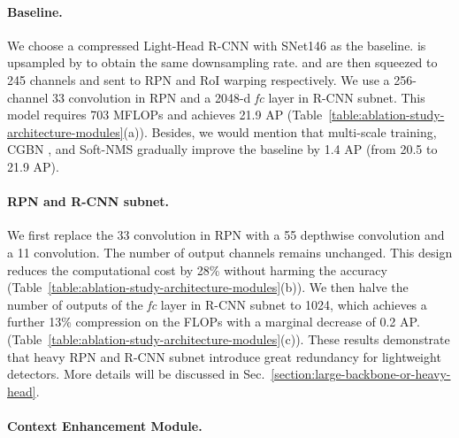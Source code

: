 \documentclass[10pt,twocolumn,letterpaper]{article}
\begin{document}
\vspace{-12pt}
\paragraph{Baseline.}

We choose a compressed Light-Head R-CNN \cite{li2017light} with SNet146 as the baseline.
 is upsampled by  to obtain the same downsampling rate.
 and  are then squeezed to 245 channels and sent to RPN and RoI warping respectively.
We use a 256-channel 33 convolution in RPN and a 2048-d \emph{fc} layer in R-CNN subnet.
This model requires 703 MFLOPs and achieves 21.9 AP (Table~\ref{table:ablation-study-architecture-modules}(a)).
Besides, we would mention that multi-scale training, CGBN \cite{peng2018megdet}, and Soft-NMS \cite{bodla2017soft} gradually improve the baseline by 1.4 AP (from 20.5 to 21.9 AP).





\vspace{-12pt}
\paragraph{RPN and R-CNN subnet.}

We first replace the 33 convolution in RPN with a 55 depthwise convolution and a 11 convolution.
The number of output channels remains unchanged.
This design reduces the computational cost by 28\% without harming the accuracy (Table~\ref{table:ablation-study-architecture-modules}(b)).
We then halve the number of outputs of the \emph{fc} layer in R-CNN subnet to 1024, which achieves a further 13\% compression on the FLOPs with a marginal decrease of 0.2 AP. (Table~\ref{table:ablation-study-architecture-modules}(c)).
These results demonstrate that heavy RPN and R-CNN subnet introduce great redundancy for lightweight detectors.
More details will be discussed in Sec.~\ref{section:large-backbone-or-heavy-head}.


\vspace{-12pt}
\paragraph{Context Enhancement Module.}
\end{document}
